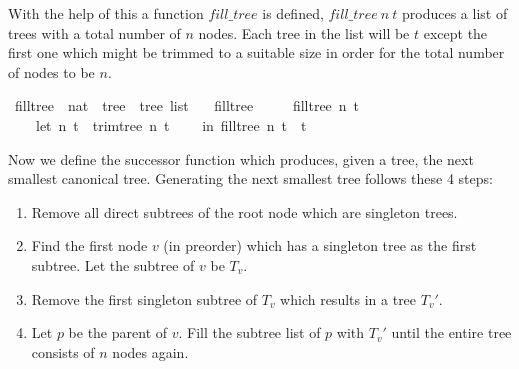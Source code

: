 With the help of this a function $fill\_tree$ is defined, $fill\_tree\ n\ t$ produces a list of trees with a total number of $n$ nodes.
Each tree in the list will be $t$ except the first one which might be trimmed to a suitable size in order for the total number of nodes to be $n$.

\begin{isabellebox}
    \isamarkupfalse%
\ fill{\isacharunderscore}{\kern0pt}tree\ {\isacharcolon}{\kern0pt}{\isacharcolon}{\kern0pt}\ {\isachardoublequoteopen}nat\ {\isasymRightarrow}\ tree\ {\isasymRightarrow}\ tree\ list{\isachardoublequoteclose}\ \isanewline
\ \ {\isachardoublequoteopen}fill{\isacharunderscore}{\kern0pt}tree\ {}\ {\isacharunderscore}{\kern0pt}\ {\isacharequal}{\kern0pt}\ {\isacharbrackleft}{\kern0pt}{\isacharbrackright}{\kern0pt}{\isachardoublequoteclose}\isanewline
{\isacharbar}{\kern0pt}\ {\isachardoublequoteopen}fill{\isacharunderscore}{\kern0pt}tree\ n\ t\ {\isacharequal}{\kern0pt}\isanewline
\ \ \ \ {\isacharparenleft}{\kern0pt}let\ {\isacharparenleft}{\kern0pt}n{\isacharprime}{\kern0pt}{\isacharcomma}{\kern0pt}\ t{\isacharprime}{\kern0pt}{\isacharparenright}{\kern0pt}\ {\isacharequal}{\kern0pt}\ trim{\isacharunderscore}{\kern0pt}tree\ n\ t\isanewline
\ \ \ \ in\ fill{\isacharunderscore}{\kern0pt}tree\ n{\isacharprime}{\kern0pt}\ t{\isacharprime}{\kern0pt}\ {\isacharat}{\kern0pt}\ {\isacharbrackleft}{\kern0pt}t{\isacharprime}{\kern0pt}{\isacharbrackright}{\kern0pt}{\isacharparenright}{\kern0pt}{\isachardoublequoteclose}
\end{isabellebox}

Now we define the successor function which produces, given a tree, the next smallest canonical tree.
Generating the next smallest tree follows these 4 steps:

\begin{enumerate}
    \item Remove all direct subtrees of the root node which are singleton trees.
    \item Find the first node $v$ (in preorder) which has a singleton tree as the first subtree. Let the subtree of $v$ be $T_v$.
    \item Remove the first singleton subtree of $T_v$ which results in a tree $T_v'$.
    \item Let $p$ be the parent of $v$. Fill the subtree list of $p$ with $T_v'$ until the entire tree consists of $n$ nodes again.
\end{enumerate}

